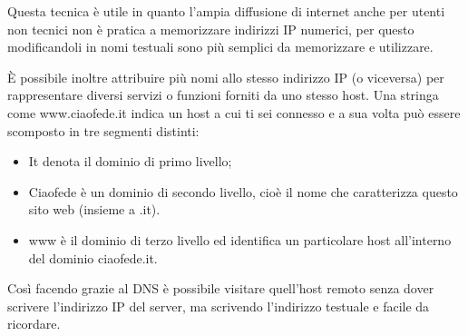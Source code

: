 Questa tecnica è utile in quanto l’ampia diffusione di internet anche per utenti non tecnici non è pratica a memorizzare indirizzi IP numerici, per questo modificandoli in nomi testuali sono più semplici da memorizzare e utilizzare.

È possibile inoltre attribuire più nomi allo stesso indirizzo IP (o viceversa) per rappresentare diversi servizi o funzioni forniti da uno stesso host.
Una stringa come www.ciaofede.it indica un host a cui ti sei connesso e a sua volta può essere scomposto in tre segmenti distinti:
\begin{itemize}
\item	It denota il dominio di primo livello;
\item	Ciaofede è un dominio di secondo livello, cioè il nome che caratterizza questo sito web (insieme a .it).
\item	www è il dominio di terzo livello ed identifica un particolare host all’interno del dominio ciaofede.it.
\end{itemize}
Così facendo grazie al DNS è possibile visitare quell’host remoto senza dover scrivere l’indirizzo IP del server, ma scrivendo l’indirizzo testuale e facile da ricordare.
